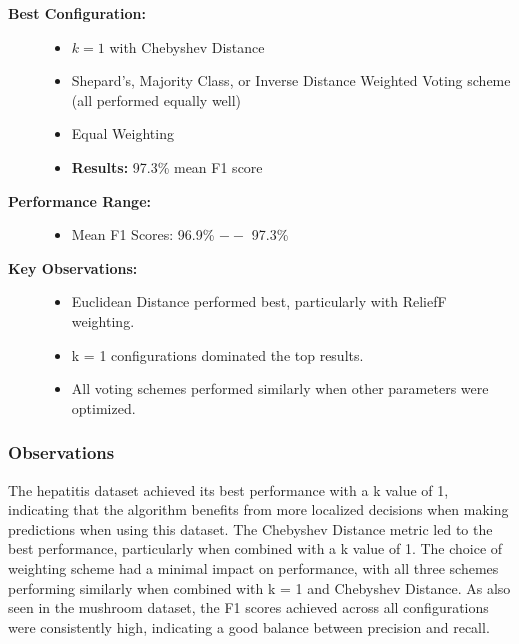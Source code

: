\begin{description}
    \item[\textbf{Best Configuration:}]\leavevmode
        \begin{itemize}
            \item $k = 1$ with Chebyshev Distance
            \item Shepard's, Majority Class, or Inverse Distance Weighted Voting scheme (all performed equally well)
            \item Equal Weighting
            \item \textbf{Results:} 97.3\% mean F1 score
        \end{itemize}
    
    \item[\textbf{Performance Range:}]\leavevmode
        \begin{itemize}
            \item Mean F1 Scores: 96.9\% $--$ 97.3\%
        \end{itemize}
    
    \item[\textbf{Key Observations:}]\leavevmode
        \begin{itemize}
            \item Euclidean Distance performed best, particularly with ReliefF weighting.
            \item k = 1 configurations dominated the top results.
            \item All voting schemes performed similarly when other parameters were optimized.
        \end{itemize}
\end{description}

\subsubsection*{Observations}
The hepatitis dataset achieved its best performance with a k value of 1, indicating that the algorithm benefits from
more localized decisions when making predictions when using this dataset.
The Chebyshev Distance metric led to the best performance, particularly when combined with a k value of 1.
The choice of weighting scheme had a minimal impact on performance, with all three schemes performing similarly when combined with k = 1 and Chebyshev Distance.
As also seen in the mushroom dataset, the F1 scores achieved across all configurations were consistently high, indicating a good balance between precision and recall.

